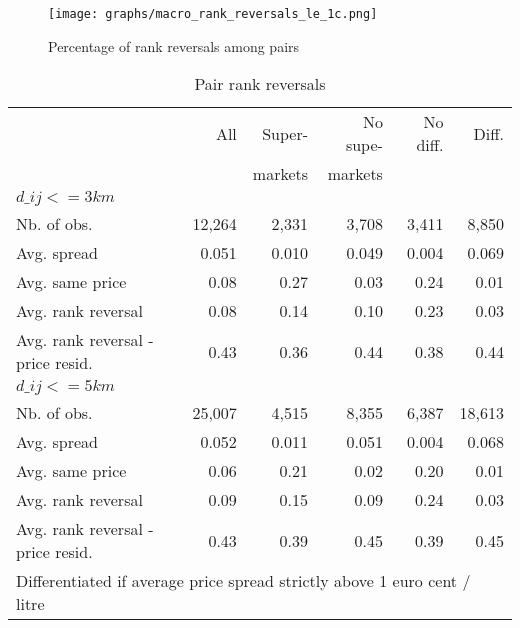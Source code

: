 \documentclass[english]{article}
\begin{document}
{\begin{figure}[!h]
    \caption{Percentage of rank reversals among pairs}
	\centering
		\texttt{[image: graphs/macro\_rank\_reversals\_le\_1c.png]}
\end{figure}

\begin{table}
\caption{Pair rank reversals}
\centering
\begin{tabular}{lrrrrr}
\hline
\hline
    & All   & Super- & No supe- & No diff. & Diff. \\
    &       & markets & markets &       &  \\
    \hline
    $d\_{ij} <= 3 km$ &       &       &       &       &  \\
    \hline
    Nb. of obs. & 12,264 & 2,331 & 3,708 & 3,411 & 8,850 \\
    Avg. spread & 0.051 & 0.010 & 0.049 & 0.004 & 0.069 \\
    Avg. same price & 0.08  & 0.27  & 0.03  & 0.24  & 0.01 \\
    Avg. rank reversal & 0.08  & 0.14  & 0.10  & 0.23  & 0.03 \\
    Avg. rank reversal - price resid. & 0.43  & 0.36  & 0.44  & 0.38  & 0.44 \\
    \hline
    $d\_{ij} <= 5 km$ &       &       &       &       &  \\
    Nb. of obs. & 25,007 & 4,515 & 8,355 & 6,387 & 18,613 \\
    Avg. spread & 0.052 & 0.011 & 0.051 & 0.004 & 0.068 \\
    Avg. same price & 0.06  & 0.21  & 0.02  & 0.20  & 0.01 \\
    Avg. rank reversal & 0.09  & 0.15  & 0.09  & 0.24  & 0.03 \\
    Avg. rank reversal - price resid. & 0.43  & 0.39  & 0.45  & 0.39  & 0.45 \\

\hline
\hline
\multicolumn{6}{l}{\small Differentiated if average price spread strictly above 1 euro cent / litre}\\
\end{tabular}
\end{table}

}
\end{document}
